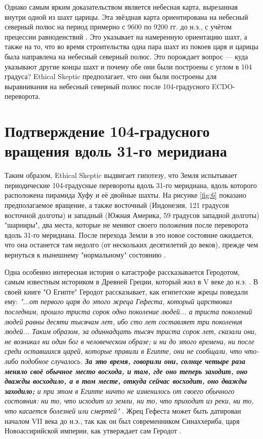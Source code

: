 \documentclass[10pt,twocolumn,letterpaper]{article}
\begin{document}
Однако самым ярким доказательством является небесная карта, вырезанная внутри одной из шахт царицы. Эта звёздная карта ориентирована на небесный северный полюс на период примерно с 9600 по 9200 гг. до н.э., с учётом прецессии равноденствий \cite{28}. Это указывает на намеренную ориентацию шахт, а также на то, что во время строительства одна пара шахт из покоев царя и царицы была направлена на небесный северный полюс. Это порождает вопрос — куда указывают другие концы шахт и почему обе они были построены с углом в 104 градуса? Ethical Skeptic предполагает, что они были построены для выравнивания на небесный северный полюс после 104-градусного ECDO-переворота.

\section{Подтверждение 104-градусного вращения вдоль 31-го меридиана}

Таким образом, Ethical Skeptic выдвигает гипотезу, что Земля испытывает периодические 104-градусные перевороты вдоль 31-го меридиана, вдоль которого расположена пирамида Хуфу и её двойные шахты. На рисунке \ref{fig:6} показано предполагаемое вращение, а также восточный (Индонезия, 121 градусов восточной долготы) и западный (Южная Америка, 59 градусов западной долготы) "шарниры", два места, которые не меняют своего положения после переворота вдоль 31-го меридиана. После перехода Земли в это новое состояние ожидается, что она останется там недолго (от нескольких десятилетий до веков), прежде чем вернуться к нынешнему "нормальному" состоянию \cite{150}.

Одна особенно интересная история о катастрофе рассказывается Геродотом, самым известным историком в Древней Греции, который жил в V веке до н.э. \cite{31}. В своей книге "О Египте" Геродот рассказывает, как египетские жрецы поведали ему: \textit{"...от первого царя до этого жреца Гефеста, который царствовал последним, прошло триста сорок одно поколение людей... а триста поколений людей равны десяти тысячам лет, ибо сто лет составляет три поколения людей... Таким образом, за одиннадцать тысяч триста сорок лет, сказали они, не возникал ни один бог в человеческом образе; и ни до этого времени, ни после среди оставшихся царей, которые правили в Египте, они не сообщали, что что-либо подобное случалось. \textbf{За это время, говорили они, солнце четыре раза меняло своё обычное место восхода, и там, где оно теперь заходит, оно дважды восходило, а в том месте, откуда сейчас восходит, оно дважды заходило;} и при этом в Египте ничто не изменилось от своего обычного состояния: ни то, что исходит из земли, ни то, что приходит из реки, ни то, что касается болезней или смертей"} \cite{32}. Жрец Гефеста может быть датирован началом VII века до н.э., так как он был современником Синаххериба, царя Новоассирийской империи, как утверждает сам Геродот \cite{32,33,34}.
\end{document}
